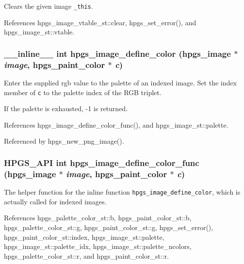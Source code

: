 Clears the given image {\tt \_\-this}. 

References hpgs\_\-image\_\-vtable\_\-st::clear, hpgs\_\-set\_\-error(), and hpgs\_\-image\_\-st::vtable.
\subsubsection[hpgs\_\-image\_\-define\_\-color]{\setlength{\rightskip}{0pt plus 5cm}\_\-\_\-inline\_\-\_\- int hpgs\_\-image\_\-define\_\-color ({\bf hpgs\_\-image} $\ast$ {\em image}, \/  {\bf hpgs\_\-paint\_\-color} $\ast$ {\em c})\hspace{0.3cm}{\tt  [static]}}\label{group__image_g2a4f19888f56d1b7fb65d6bba76fde9f}


Enter the supplied rgb value to the palette of an indexed image. Set the index member of {\tt c} to the palette index of the RGB triplet.

If the palette is exhausted, -1 is returned. 

References hpgs\_\-image\_\-define\_\-color\_\-func(), and hpgs\_\-image\_\-st::palette.

Referenced by hpgs\_\-new\_\-png\_\-image().
\subsubsection[hpgs\_\-image\_\-define\_\-color\_\-func]{\setlength{\rightskip}{0pt plus 5cm}HPGS\_\-API int hpgs\_\-image\_\-define\_\-color\_\-func ({\bf hpgs\_\-image} $\ast$ {\em image}, \/  {\bf hpgs\_\-paint\_\-color} $\ast$ {\em c})}\label{group__image_g7544e23df1fac79399161ceeb9ca77a3}


The helper function for the inline function {\tt hpgs\_\-image\_\-define\_\-color}, which is actually called for indexed images. 

References hpgs\_\-palette\_\-color\_\-st::b, hpgs\_\-paint\_\-color\_\-st::b, hpgs\_\-palette\_\-color\_\-st::g, hpgs\_\-paint\_\-color\_\-st::g, hpgs\_\-set\_\-error(), hpgs\_\-paint\_\-color\_\-st::index, hpgs\_\-image\_\-st::palette, hpgs\_\-image\_\-st::palette\_\-idx, hpgs\_\-image\_\-st::palette\_\-ncolors, hpgs\_\-palette\_\-color\_\-st::r, and hpgs\_\-paint\_\-color\_\-st::r.

